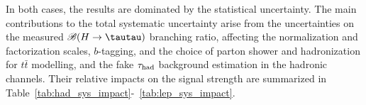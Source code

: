 In both cases, the results are dominated by the statistical uncertainty.
The main contributions to the total systematic uncertainty arise from the uncertainties on the measured $\BR(H\to \tautau)$ branching ratio,
affecting the normalization and factorization scales, $b$-tagging, and the choice of parton shower and hadronization for $t\bar t$ modelling, and the fake $\tau_{\mathrm{had}}$ background estimation in the hadronic channels. Their relative impacts on the signal strength are summarized in Table~\ref{tab:had_sys_impact}-~\ref{tab:lep_sys_impact}.
